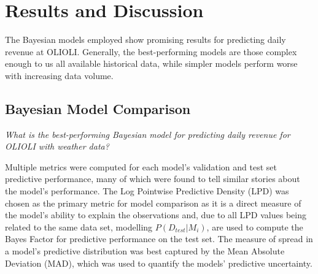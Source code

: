\section{Results and Discussion}
The Bayesian models employed show promising results for predicting daily
revenue at OLIOLI. 
Generally, the best-performing models are those complex
enough to us all available historical data, while simpler models
perform worse with increasing data volume.
\subsection{Bayesian Model Comparison}
\begin{center}
  \textit{What is the best-performing Bayesian model for predicting daily revenue for OLIOLI with weather data? }
\end{center}
Multiple metrics were computed for each model's validation and test set
predictive performance, many of which were found to tell similar stories about
the model's performance. The Log Pointwise Predictive Density (LPD) was chosen
as the primary metric for model comparison as it is a direct measure of the
model's ability to explain the observations and, due to all LPD values being
related to the same data set, modelling $P(D_{test}|M_i)$, are used to compute
the Bayes Factor for predictive performance on the test set. The measure of
spread in a model's predictive distribution was best captured by the Mean
Absolute Deviation (MAD), which was used to quantify the models' predictive
uncertainty.

